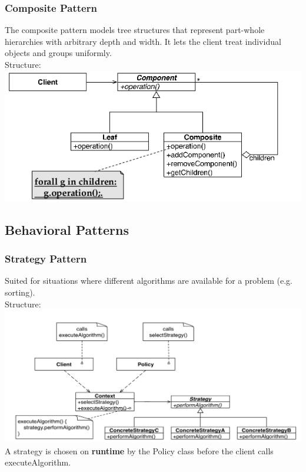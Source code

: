 \subsubsection{Composite Pattern}
The composite pattern models tree structures that represent part-whole hierarchies with arbitrary depth and width.
It lets the client treat individual objects and groups uniformly. \\
Structure:\\
\includegraphics[width=\linewidth]{images/pattern_composite.png}
\newpage


\subsection{Behavioral Patterns}

\subsubsection{Strategy Pattern}
Suited for situations where different algorithms are available for a problem (e.g. sorting).\\
Structure:\\
\includegraphics[width=\linewidth]{images/pattern_strategy.png}
A strategy is chosen on \textbf{runtime} by the Policy class before the client calls executeAlgorithm.
\newpage

